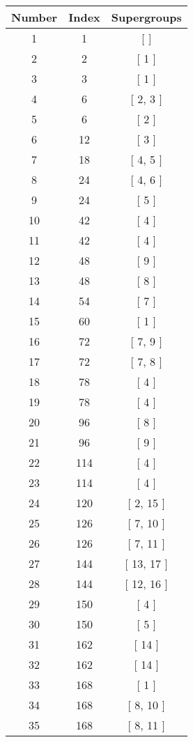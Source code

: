 \begin{center}
\begin{longtable}[H]{|| c c c ||}
\hline
Number & Index & Supergroups \\ 
\hline
1 & 1 & [  ] \\ 
\hline
2 & 2 & [ 1 ] \\ 
\hline
3 & 3 & [ 1 ] \\ 
\hline
4 & 6 & [ 2, 3 ] \\ 
\hline
5 & 6 & [ 2 ] \\ 
\hline
6 & 12 & [ 3 ] \\ 
\hline
7 & 18 & [ 4, 5 ] \\ 
\hline
8 & 24 & [ 4, 6 ] \\ 
\hline
9 & 24 & [ 5 ] \\ 
\hline
10 & 42 & [ 4 ] \\ 
\hline
11 & 42 & [ 4 ] \\ 
\hline
12 & 48 & [ 9 ] \\ 
\hline
13 & 48 & [ 8 ] \\ 
\hline
14 & 54 & [ 7 ] \\ 
\hline
15 & 60 & [ 1 ] \\ 
\hline
16 & 72 & [ 7, 9 ] \\ 
\hline
17 & 72 & [ 7, 8 ] \\ 
\hline
18 & 78 & [ 4 ] \\ 
\hline
19 & 78 & [ 4 ] \\ 
\hline
20 & 96 & [ 8 ] \\ 
\hline
21 & 96 & [ 9 ] \\ 
\hline
22 & 114 & [ 4 ] \\ 
\hline
23 & 114 & [ 4 ] \\ 
\hline
24 & 120 & [ 2, 15 ] \\ 
\hline
25 & 126 & [ 7, 10 ] \\ 
\hline
26 & 126 & [ 7, 11 ] \\ 
\hline
27 & 144 & [ 13, 17 ] \\ 
\hline
28 & 144 & [ 12, 16 ] \\ 
\hline
29 & 150 & [ 4 ] \\ 
\hline
30 & 150 & [ 5 ] \\ 
\hline
31 & 162 & [ 14 ] \\ 
\hline
32 & 162 & [ 14 ] \\ 
\hline
33 & 168 & [ 1 ] \\ 
\hline
34 & 168 & [ 8, 10 ] \\ 
\hline
35 & 168 & [ 8, 11 ] \\ 

\end{longtable}
\end{center}
